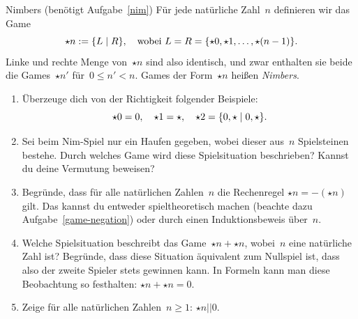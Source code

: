 \documentclass{zirkelblatt}
\newcommand{\fuzzy}{\mathrel{||}}
\begin{document}
\begin{aufgabe}{Nimbers (benötigt Aufgabe~\ref{nim})}
\label{nimbers}
Für jede natürliche Zahl~$n$ definieren wir das Game
\[ \star n := \{ L \mathrel{|} R \}, \quad
\text{wobei~$L = R = \{ \star 0, \star 1, \ldots, \star(n-1) \}$.} \]
Linke und rechte Menge von~$\star n$ sind also identisch, und zwar enthalten
sie beide die Games~$\star n'$ für~$0 \leq n' < n$. Games der Form~$\star n$
heißen \emph{Nimbers}.
\begin{enumerate}
\item Überzeuge dich von der Richtigkeit folgender Beispiele:
\[ \star 0 = 0, \quad
  \star 1 = \star, \quad
  \star 2 = \{ 0,\star \mathrel{|} 0,\star \}. \]
\item Sei beim Nim-Spiel nur ein Haufen gegeben, wobei dieser aus~$n$
Spielsteinen bestehe. Durch welches Game wird diese Spielsituation beschrieben?
Kannst du deine Vermutung beweisen?
\item Begründe, dass für alle natürlichen Zahlen~$n$ die Rechenregel
$\star n = -(\star n)$
gilt. Das kannst du entweder spieltheoretisch machen (beachte dazu
Aufgabe~\ref{game-negation}) oder durch einen Induktionsbeweis über~$n$.
\item Welche Spielsituation beschreibt das Game~$\star n + \star n$, wobei~$n$
eine natürliche Zahl ist? Begründe, dass diese Situation äquivalent zum
Nullspiel ist, dass also der zweite Spieler stets gewinnen kann. In Formeln
kann man diese Beobachtung so festhalten: $\star n + \star n = 0.$
\item Zeige für alle natürlichen Zahlen~$n \geq 1$: $\star n \fuzzy 0$.
\end{enumerate}
\end{aufgabe}
\end{document}
